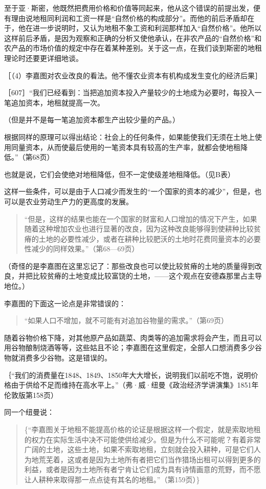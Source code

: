 至于亚·斯密，他既然把费用价格和价值等同起来，他从这个错误的前提出发，便有理由说地租同利润和工资一样是“自然价格的构成部分”。而他的前后矛盾却在于，他在进一步说明时，又认为地租不象工资和利润那样加入“自然价格”。他所以这样前后矛盾，是因为观察和正确的分析又使他承认，在非农产品的“自然价格”和农产品的市场价值的规定中存在着某种差别。关于这一点，在我们谈到斯密的地租理论时还要更详细地谈。

［（4）李嘉图对农业改良的看法。他不懂农业资本有机构成发生变化的经济后果］

［607］“我们已经看到：当把追加资本投入产量较少的土地成为必要时，每投入一笔追加资本，地租就提高一次。

（但是并不是每一笔追加资本都生产出较少量的产品。）

根据同样的原理可以得出结论：社会上的任何条件，如果能使我们无须在土地上使用同量资本，从而使最后使用的一笔资本具有较高的生产率，就都会使地租降低。”（第68页）

也就是说，它们会使绝对地租降低，但不一定使级差地租降低。（见B表）

这样一些条件，可以是由于人口减少而发生的“一个国家的资本的减少”，但是，也可以是农业劳动生产力的更高度的发展。

\begin{quote}{“但是，这样的结果也能在一个国家的财富和人口增加的情况下产生，如果随着这种增加农业也进行显著的改良，因为这种改良能够得到使耕种比较贫瘠的土地的必要性减少，或者在耕种比较肥沃的土地时花费同量资本的必要性减少的同样效果。”（第68—69页）}\end{quote}

（奇怪的是李嘉图在这里忘记了：那些改良也可以使比较贫瘠的土地的质量得到改良，并把比较贫瘠的土地变成比较富饶的土地，——这个观点在安德森那里占主导地位。）

李嘉图的下面这一论点是非常错误的：

\begin{quote}{“如果人口不增加，就不可能有对追加谷物量的需求。”（第69页）}\end{quote}

随着谷物价格下降，对其他原产品如蔬菜、肉类等的追加需求将会产生，而且可以用谷物酿制烧酒等等，这些姑且不论；李嘉图在这里假定，全部人口想消费多少谷物就消费多少谷物。这是错误的。

｛“我们的消费量在1848、1849、1850年大大增长，说明我们以前吃不饱，说明价格由于供给不足而维持在高水平上。”（弗·威·纽曼《政治经济学讲演集》1851年伦敦版第158页）

同一个纽曼说：

\begin{quote}\{“李嘉图关于地租不能提高价格的论证是根据这样一个假定，就是索取地租的权力在实际生活中决不可能使供给减少。但是为什么不可能呢？有着非常广阔的土地，这些土地，如果不索取地租，立刻就会投入耕种，可是它们人为地荒芜着，这或者是因为土地所有者把它们当作猎场出租可以得到更多的利益，或者是因为土地所有者宁肯让它们成为具有诗情画意的荒野，而不愿让人耕种来取得那一点点徒有其名的地租。”（第159页）\}\end{quote}

